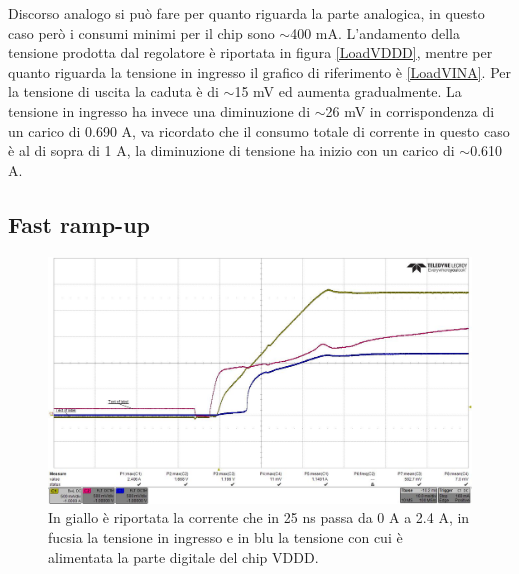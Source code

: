 Discorso analogo si può fare per quanto riguarda la parte analogica, in questo caso però i consumi minimi per il chip sono $\sim$400 mA. L'andamento della tensione prodotta dal regolatore è riportata in figura \ref{LoadVDDD}, mentre per quanto riguarda la tensione in ingresso il grafico di riferimento è \ref{LoadVINA}. 
Per la tensione di uscita la caduta è di $\sim$15 mV ed aumenta gradualmente. La tensione in ingresso ha invece una diminuzione di $\sim$26 mV in corrispondenza di un carico di 0.690 A, va ricordato che il consumo totale di corrente in questo caso è al di sopra di 1 A, la diminuzione di tensione ha inizio con un carico di $\sim$0.610 A.

\subsection{Fast ramp-up}
\begin{figure}
\centering
\includegraphics[scale=.3]{Immagini/rd-powup-dir6}
\caption{In giallo è riportata la corrente che in 25 ns passa da 0 A a 2.4 A, in fucsia la tensione in ingresso e in blu la tensione con cui è alimentata la parte digitale del chip VDDD.}
\label{rd-powup-dir6}
\end{figure}

